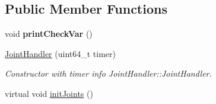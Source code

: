 \subsection*{Public Member Functions}
\begin{DoxyCompactItemize}
\item 
void {\bfseries print\+Check\+Var} ()\hypertarget{classJointHandler_a959c1e24c4cbd665d497c021edcf8e96}{}\label{classJointHandler_a959c1e24c4cbd665d497c021edcf8e96}

\item 
\hyperlink{classJointHandler_ab7a86a3c24b204f1f8d702836b2bf379}{Joint\+Handler} (uint64\+\_\+t timer)\hypertarget{classJointHandler_ab7a86a3c24b204f1f8d702836b2bf379}{}\label{classJointHandler_ab7a86a3c24b204f1f8d702836b2bf379}

\begin{DoxyCompactList}\small\item\em Constructor with timer info  Joint\+Handler\+::\+Joint\+Handler. \end{DoxyCompactList}\item 
virtual void \hyperlink{classJointHandler_a8a4fd8b876ad5118d27dbc668a003f28}{init\+Joints} ()\hypertarget{classJointHandler_a8a4fd8b876ad5118d27dbc668a003f28}{}\label{classJointHandler_a8a4fd8b876ad5118d27dbc668a003f28}


\end{DoxyCompactItemize}
